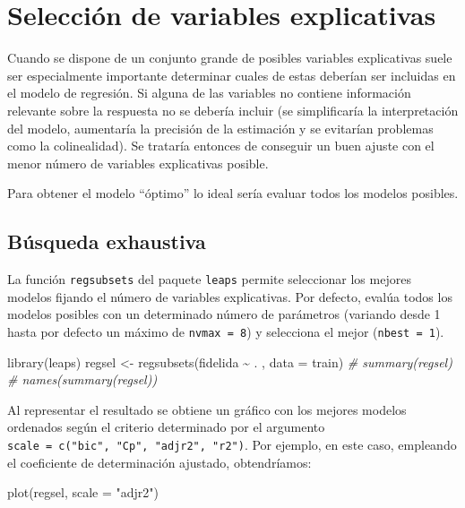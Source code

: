\documentclass[
]{book}
\newenvironment{Shaded}{\begin{snugshade}}{\end{snugshade}}
\newcommand{\AttributeTok}[1]{\textcolor[rgb]{0.77,0.63,0.00}{#1}}
\newcommand{\CommentTok}[1]{\textcolor[rgb]{0.56,0.35,0.01}{\textit{#1}}}
\newcommand{\FunctionTok}[1]{\textcolor[rgb]{0.00,0.00,0.00}{#1}}
\newcommand{\NormalTok}[1]{#1}
\newcommand{\OtherTok}[1]{\textcolor[rgb]{0.56,0.35,0.01}{#1}}
\newcommand{\SpecialCharTok}[1]{\textcolor[rgb]{0.00,0.00,0.00}{#1}}
\newcommand{\StringTok}[1]{\textcolor[rgb]{0.31,0.60,0.02}{#1}}
\theoremstyle{break}
\theoremstyle{definition}
\theoremstyle{definition}
\theoremstyle{definition}
\theoremstyle{definition}
\theoremstyle{remark}
\begin{document}
\hypertarget{seleccion-reg-lineal}{%
\section{Selección de variables explicativas}\label{seleccion-reg-lineal}}

Cuando se dispone de un conjunto grande de posibles variables explicativas
suele ser especialmente importante determinar cuales de estas deberían ser
incluidas en el modelo de regresión. Si alguna de las variables no contiene
información relevante sobre la respuesta no se debería incluir (se simplificaría
la interpretación del modelo, aumentaría la precisión de la estimación y se
evitarían problemas como la colinealidad). Se trataría entonces de conseguir
un buen ajuste con el menor número de variables explicativas posible.

Para obtener el modelo ``óptimo'' lo ideal sería evaluar todos los modelos posibles.

\hypertarget{buxfasqueda-exhaustiva}{%
\subsection{Búsqueda exhaustiva}\label{buxfasqueda-exhaustiva}}

La función \texttt{regsubsets} del paquete \texttt{leaps} permite seleccionar los mejores modelos
fijando el número de variables explicativas.
Por defecto, evalúa todos los modelos posibles con un determinado número de
parámetros (variando desde 1 hasta por defecto un máximo de \texttt{nvmax\ =\ 8})
y selecciona el mejor (\texttt{nbest\ =\ 1}).

\begin{Shaded}
\begin{Highlighting}[]
\FunctionTok{library}\NormalTok{(leaps)}
\NormalTok{regsel }\OtherTok{\textless{}{-}} \FunctionTok{regsubsets}\NormalTok{(fidelida }\SpecialCharTok{\textasciitilde{}}\NormalTok{ . , }\AttributeTok{data =}\NormalTok{ train)}
\CommentTok{\# summary(regsel)}
\CommentTok{\# names(summary(regsel))}
\end{Highlighting}
\end{Shaded}

Al representar el resultado se obtiene un gráfico con los mejores modelos ordenados
según el criterio determinado por el argumento \texttt{scale\ =\ c("bic",\ "Cp",\ "adjr2",\ "r2")}.
Por ejemplo, en este caso, empleando el coeficiente de determinación ajustado, obtendríamos:

\begin{Shaded}
\begin{Highlighting}[]
\FunctionTok{plot}\NormalTok{(regsel, }\AttributeTok{scale =} \StringTok{"adjr2"}\NormalTok{)}
\end{Highlighting}
\end{Shaded}
\end{document}
